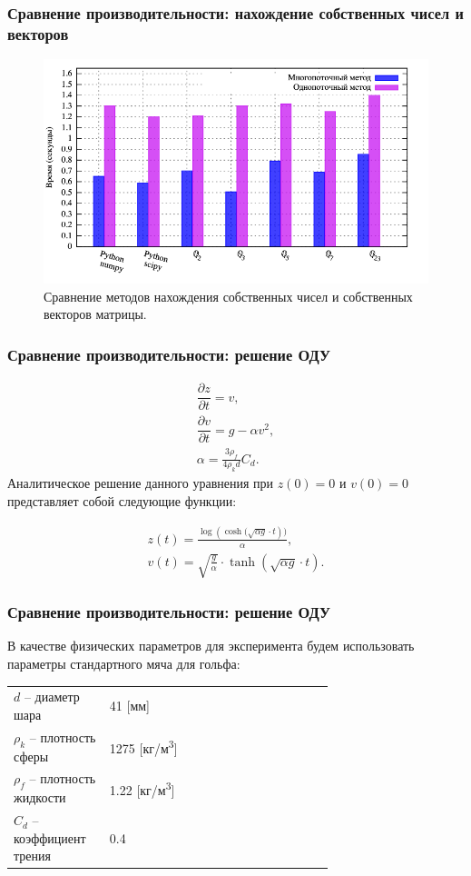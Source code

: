 \documentclass[10pt,professionalfont,utf8,presentation,compress]{beamer}
\theoremstyle{definition}
\theoremstyle{plain}
\begin{document}
\begin{frame}
\frametitle{Сравнение производительности: нахождение собственных чисел и векторов}
\begin{figure}[H]
\centerline{\includegraphics[width=0.95\linewidth]{../gnuplot/multi/jacoby/plot.png}}
\caption{Сравнение методов нахождения собственных чисел и собственных векторов матрицы.}
\label{img:multi:jacoby}
\end{figure}
\end{frame}


\begin{frame}
\frametitle{Сравнение производительности: решение ОДУ}
\begin{equation}
\begin{aligned}
\dfrac{\partial z}{ \partial t} = v, \\
\dfrac{\partial v}{ \partial t} = g - \alpha v^2, \\
\alpha = \frac{3\rho_f}{4\rho_k d}C_d.
\end{aligned}
\end{equation}
\noindent Аналитическое решение данного уравнения при $z(0)=0$ и $v(0)=0$ представляет собой следующие функции:

\begin{equation}
\begin{aligned}
z(t)=\frac{\log{(\cosh{(\sqrt{\alpha g} \cdot t})})}{\alpha}, \\
v(t)=\sqrt{\frac{g}{\alpha}} \cdot \tanh{(\sqrt{\alpha g} \cdot t)}.
\end{aligned}
\end{equation}
\end{frame}


\begin{frame}
\frametitle{Сравнение производительности: решение ОДУ}
В качестве физических параметров для эксперимента будем использовать параметры стандартного мяча для гольфа:
\begin{threeparttable}
\begin{longtable}[H]{lp{0.7\linewidth}}
{$d$} -- диаметр шара & 41 [мм] \\
{$\rho_k$} -- плотность сферы & 1275 [кг/м\textsuperscript{3}] \\
{$\rho_f$} -- плотность жидкости & 1.22 [кг/м\textsuperscript{3}] \\
{$C_d$} -- коэффициент трения & 0.4
\end{longtable}
\end{threeparttable}
\end{frame}
\end{document}
